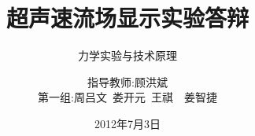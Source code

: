 \documentclass{beamer}
\begin{document}


\title{超声速流场显示实验答辩}
\subtitle{力学实验与技术原理}
\author[第一组]{指导教师:顾洪斌\\第一组:周吕文{~}娄开元{~}王祺{~~}姜智捷}
\date{2012年7月3日}
\frame[plain]{\titlepage} %

\subject{Computer Tools, TeX, Slide}









\end{document}
